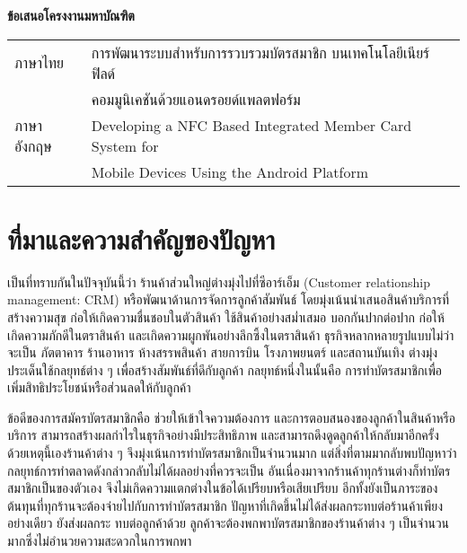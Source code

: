 \documentclass[a4paper]{article}
\newcommand{\MarginText}[1]{\marginpar{\raggedleft\itshape\small#1}} %
\newcommand{\Description}[1]{\hangindent=2em\hangafter=0\noindent\raggedright\footnotesize{#1}\par\normalsize\vspace{1em}}
\begin{document}
\clearpage

\begin{center}
{\huge \bf ข้อเสนอโครงงานมหาบัณฑิต}
\end{center}



\Large{\noindent\hspace{0.7cm}\setlength{\tabcolsep}{15pt}
\begin{tabular}{l l}    
	ภาษาไทย 		& การพัฒนาระบบสำหรับการรวบรวมบัตรสมาชิก บนเทคโนโลยีเนียร์ฟิลด์ \\
				& คอมมูนิเคชันด้วยแอนดรอยด์แพลตฟอร์ม \\
	ภาษาอังกฤษ	& Developing a NFC Based Integrated Member Card System for \\
				& Mobile Devices Using the Android Platform \\    
\end{tabular}
}

\section{ที่มาและความสำคัญของปัญหา}

เป็นที่ทราบกันในปัจจุบันนี้ว่า ร้านค้าส่วนใหญ่ต่างมุ่งไปที่ซีอาร์เอ็ม (Customer relationship management: CRM) หรือพัฒนาด้านการจัดการลูกค้าสัมพันธ์ โดยมุ่งเน้นนำเสนอสินค้าบริการที่สร้างความสุข ก่อให้เกิดความชื่นชอบในตัวสินค้า ใช้สินค้าอย่างสม่ำเสมอ บอกกันปากต่อปาก ก่อให้เกิดความภักดีในตราสินค้า และเกิดความผูกพันอย่างลึกซึ้งในตราสินค้า ธุรกิจหลากหลายรูปแบบไม่ว่าจะเป็น ภัตตาคาร ร้านอาหาร ห้างสรรพสินค้า สายการบิน โรงภาพยนตร์ และสถานบันเทิง ต่างมุ่งประเด็นใช้กลยุทธ์ต่าง ๆ เพื่อสร้างสัมพันธ์ที่ดีกับลูกค้า กลยุทธ์หนึ่งในนั้นคือ การทำบัตรสมาชิกเพื่อเพิ่มสิทธิประโยชน์หรือส่วนลดให้กับลูกค้า

ข้อดีของการสมัครบัตรสมาชิกคือ ช่วยให้เข้าใจความต้องการ และการตอบสนองของลูกค้าในสินค้าหรือบริการ สามารถสร้างผลกําไรในธุรกิจอย่างมีประสิทธิภาพ และสามารถดึงดูดลูกค้าให้กลับมาอีกครั้ง ด้วยเหตุนี้เองร้านค้าต่าง ๆ จึงมุ่งเน้นการทำบัตรสมาชิกเป็นจำนวนมาก แต่สิ่งที่ตามมากลับพบปัญหาว่ากลยุทธ์การทำตลาดดังกล่าวกลับไม่ได้ผลอย่างที่ควรจะเป็น อันเนื่องมาจากร้านค้าทุกร้านต่างก็ทำบัตรสมาชิกเป็นของตัวเอง จึงไม่เกิดความแตกต่างในข้อได้เปรียบหรือเสียเปรียบ อีกทั้งยังเป็นภาระของต้นทุนที่ทุกร้านจะต้องจ่ายไปกับการทำบัตรสมาชิก ปัญหาที่เกิดขึ้นไม่ได้ส่งผลกระทบต่อร้านค้าเพียงอย่างเดียว  ยังส่งผลกระ \newline ทบต่อลูกค้าด้วย ลูกค้าจะต้องพกพาบัตรสมาชิกของร้านค้าต่าง ๆ เป็นจำนวนมากซึ่งไม่อำนวยความสะดวกในการพกพา
\end{document}
